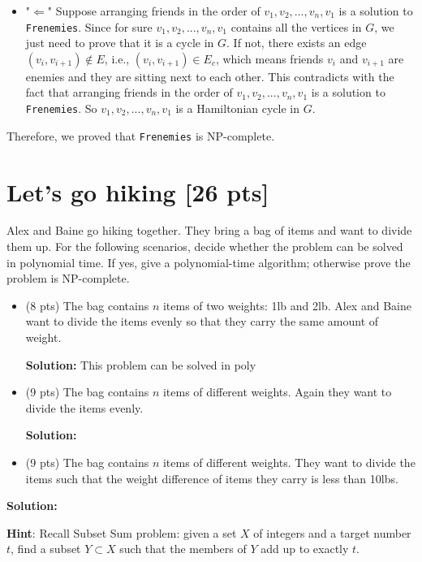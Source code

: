 \documentclass{article}
\begin{document}
\begin{tcolorbox}
\begin{itemize}
\begin{itemize}
\item "$\Leftarrow$" Suppose arranging friends in the order of $v_1, v_2, ..., v_n, v_1$ is a solution to \texttt{Frenemies}. Since for sure $v_1, v_2, ..., v_n, v_1$ contains all the vertices in $G$, we just need to prove that it is a cycle in $G$.  If not, there exists an edge $(v_i, v_{i+1}) \notin E$, i.e.,  $(v_i, v_{i+1}) \in E_c$, which means friends $v_i$ and $v_{i+1}$ are enemies and they are sitting next to each other. This contradicts with the fact that arranging friends in the order of $v_1, v_2, ..., v_n, v_1$ is a solution to \texttt{Frenemies}. So $v_1, v_2, ..., v_n, v_1$ is a Hamiltonian cycle in $G$. 
\end{itemize} 
Therefore, we proved that \texttt{Frenemies} is NP-complete.
\end{itemize}
\end{tcolorbox}

\section{Let's go hiking [26 pts]}
Alex and Baine go hiking together. They bring a bag of items and want to divide them up. For the following scenarios, decide whether the problem can be solved in polynomial time. If yes, give a polynomial-time algorithm; otherwise prove the problem is NP-complete. 
\begin{itemize}
	\item (8 pts) The bag contains $n$ items of two weights: 1lb and 2lb. Alex and Baine want to divide the items evenly so that they carry the same amount of weight. 
	
\begin{tcolorbox}
{\bf Solution:} This problem can be solved in poly
\end{tcolorbox}
	
	\item (9 pts) The bag contains $n$ items of different weights. Again they want to divide the items evenly. 
\begin{tcolorbox}
{\bf Solution:}
\end{tcolorbox}

	\item (9 pts) The bag contains $n$ items of different weights. They want to divide the items such that the weight difference of items they carry is less than 10lbs. 
\end{itemize}
\begin{tcolorbox}
{\bf Solution:}
\end{tcolorbox}

\textbf{Hint}: Recall Subset Sum problem: given a set $X$ of integers and a target number $t$, find a subset $Y\subset X$ such that the members of $Y$ add up to exactly $t$. 
\end{document}
